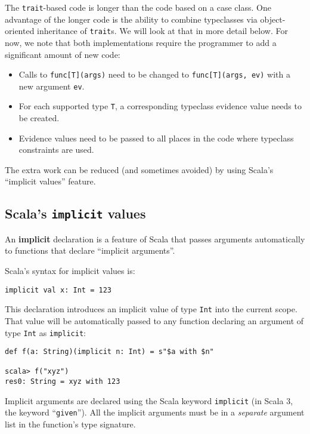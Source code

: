 The \lstinline!trait!-based code is longer than the code based on
a case class. One advantage of the longer code is the ability to combine
typeclasses via object-oriented inheritance of \lstinline!trait!s.
We will look at that in more detail below. For now, we note that both
implementations require the programmer to add a significant amount
of new code:
\begin{itemize}
\item Calls to \lstinline!func[T](args)! need to be changed to \lstinline!func[T](args, ev)!
with a new argument \lstinline!ev!.
\item For each supported type \lstinline!T!, a corresponding typeclass
evidence value needs to be created.
\item Evidence values need to be passed to all places in the code where
typeclass constraints are used.
\end{itemize}
The extra work can be reduced (and sometimes avoided) by using Scala\textsf{'}s
\textsf{``}implicit values\textsf{''} feature. 

\subsection{Scala\textsf{'}s \texttt{implicit} values}

An \textbf{implicit } declaration is a feature
of Scala that passes arguments automatically to functions that declare
\textsf{``}implicit arguments\textsf{''}.

Scala\textsf{'}s syntax for implicit values is:
\begin{lstlisting}
implicit val x: Int = 123
\end{lstlisting}
This declaration introduces an implicit value of type \lstinline!Int!
into the current scope. That value will be automatically passed to
any function declaring an argument of type \lstinline!Int! as \lstinline!implicit!:
\begin{lstlisting}
def f(a: String)(implicit n: Int) = s"$a with $n"

scala> f("xyz")
res0: String = xyz with 123
\end{lstlisting}
Implicit arguments are declared using the Scala keyword \lstinline!implicit!
(in Scala 3, the keyword \textsf{``}\lstinline!given!\textsf{''}). All the implicit
arguments must be in a \emph{separate} argument
list in the function\textsf{'}s type signature.

